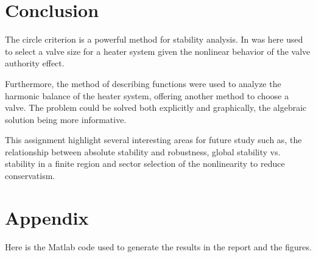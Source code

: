 \documentclass[a4paper, titlepage]{article}
\begin{document}
 
\section{Conclusion}
The circle criterion is a powerful method for stability analysis.
In was here used to select a valve size for a heater system given the nonlinear behavior of the valve authority effect.

Furthermore, the method of describing functions were used to analyze the harmonic balance of the heater system, offering another method to choose a valve.
The problem could be solved both explicitly and graphically, the algebraic solution being more informative.

This assignment highlight several interesting areas for future study such as, the relationship between absolute stability and robustness, global stability vs. stability in a finite region and sector selection of the nonlinearity to reduce conservatism.   



%
%


\clearpage


\clearpage
\appendix

\section{Appendix}
Here is the Matlab code used to generate the results in the report and the figures.


\end{document}
